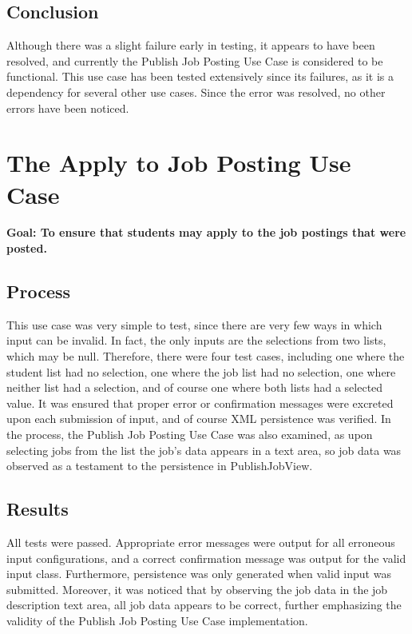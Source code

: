 \documentclass[12pt]{report}
\begin{document}
\subsection*{Conclusion}
Although there was a slight failure early in testing, it appears to have been resolved, and
currently the Publish Job Posting Use Case is considered to be functional. This use case has been
tested extensively since its failures, as it is a dependency for several other use cases. Since the
error was resolved, no other errors have been noticed.

\section{The Apply to Job Posting Use Case}
\textbf{Goal: To ensure that students may apply to the job postings that were posted.}
\subsection*{Process}
This use case was very simple to test, since there are very few ways in which input can be invalid.
In fact, the only inputs are the selections from two lists, which may be null. Therefore, there
were four test cases, including one where the student list had no selection, one where the job list
had no selection, one where neither list had a selection, and of course one where both lists had a
selected value. It was ensured that proper error or confirmation messages were excreted upon each
submission of input, and of course XML persistence was verified. In the process, the Publish Job
Posting Use Case was also examined, as upon selecting jobs from the list the job's data appears in a
text area, so job data was observed as a testament to the persistence in PublishJobView.
\subsection*{Results}
All tests were passed. Appropriate error messages were output for all erroneous input
configurations, and a correct confirmation message was output for the valid input class.
Furthermore, persistence was only generated when valid input was submitted. Moreover, it was noticed
that by observing the job data in the job description text area, all job data appears to be correct,
further emphasizing the validity of the Publish Job Posting Use Case implementation.
\end{document}
